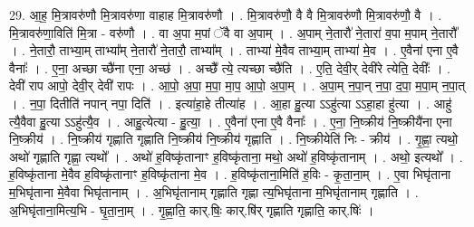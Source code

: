 \documentclass[17pt]{extarticle}
\begin{document}
29. आ॒ह॒ मि॒त्रावरु॑णौ मि॒त्रावरु॑णा वाहाह मि॒त्रावरु॑णौ । . मि॒त्रावरु॑णौ॒ वै वै मि॒त्रावरु॑णौ मि॒त्रावरु॑णौ॒ वै । . मि॒त्रावरु॑णा॒विति॑ मि॒त्रा - वरु॑णौ । . वा अ॒पा म॒पां ॅवै वा अ॒पाम् । . अ॒पाम् ने॒तारौ॑ ने॒तारा॑ व॒पा म॒पाम् ने॒तारौ᳚ । . ने॒तारौ॒ ताभ्या॒म् ताभ्या᳚म् ने॒तारौ॑ ने॒तारौ॒ ताभ्या᳚म् । . ताभ्या॑ मे॒वैव ताभ्या॒म् ताभ्या॑ मे॒व । . ए॒वैना॑ एना ए॒वै वैनाः᳚ । . ए॒ना॒ अच्छा च्छै॑ना एना॒ अच्छ॑ । . अच्छै᳚ त्ये॒ त्यच्छा च्छै॑ति । . ए॒ति॒ देवी॒र् देवी॑रे त्येति॒ देवीः᳚ । . देवी॑ राप आपो॒ देवी॒र् देवी॑ रापः । . आ॒पो॒ अ॒पा॒ म॒पा॒ मा॒प॒ आ॒पो॒ अ॒पा॒म् । . अ॒पा॒म् न॒पा॒न् न॒पा॒ द॒पा॒ म॒पा॒म् न॒पा॒त् । . न॒पा॒ दितीति॑ नपान् नपा॒ दिति॑ । . इत्या॑हा॒हे तीत्या॑ह । . आ॒हा हु॒त्या ऽऽहु॑त्या ऽऽहा॒हा हु॑त्या । . आहु॑ त्यै॒वैवा हु॒त्या ऽऽहु॑त्यै॒व । . आहु॒त्येत्या - हु॒त्या॒ । . ए॒वैना॑ एना ए॒वै वैनाः᳚ । . ए॒ना॒ नि॒ष्क्रीय॑ नि॒ष्क्रीयै॑ना एना नि॒ष्क्रीय॑ । . नि॒ष्क्रीय॑ गृह्णाति गृह्णाति नि॒ष्क्रीय॑ नि॒ष्क्रीय॑ गृह्णाति । . नि॒ष्क्रीयेति॑ निः - क्रीय॑ । . गृ॒ह्णा॒ त्यथो॒ अथो॑ गृह्णाति गृह्णा॒ त्यथो᳚ । . अथो॑ ह॒विष्कृ॑तानाꣳ ह॒विष्कृ॑ताना॒ मथो॒ अथो॑ ह॒विष्कृ॑तानाम् । . अथो॒ इत्यथो᳚ । . ह॒विष्कृ॑ताना मे॒वैव ह॒विष्कृ॑तानाꣳ ह॒विष्कृ॑ताना मे॒व । . ह॒विष्कृ॑ताना॒मिति॑ ह॒विः - कृ॒ता॒ना॒म् । . ए॒वा भिघृ॑ताना म॒भिघृ॑ताना मे॒वैवा भिघृ॑तानाम् । . अ॒भिघृ॑तानाम् गृह्णाति गृह्णा त्य॒भिघृ॑ताना म॒भिघृ॑तानाम् गृह्णाति । . अ॒भिघृ॑ताना॒मित्य॒भि - घृ॒ता॒ना॒म् । . गृ॒ह्णा॒ति॒ कार्.षिः॒ कार्.षि॑र् गृह्णाति गृह्णाति॒ कार्.षिः॑ । \newline
\end{document}

